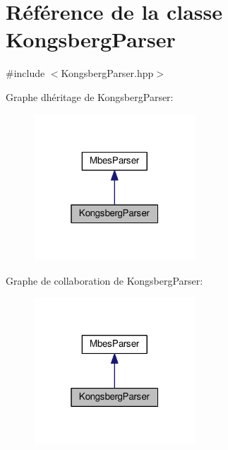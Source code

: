 \hypertarget{classKongsbergParser}{}\section{Référence de la classe Kongsberg\+Parser}
\label{classKongsbergParser}


{\ttfamily \#include $<$Kongsberg\+Parser.\+hpp$>$}



Graphe d\textquotesingle{}héritage de Kongsberg\+Parser\+:
\nopagebreak
\begin{figure}[H]
\begin{center}
\leavevmode
\includegraphics[width=172pt]{classKongsbergParser__inherit__graph}
\end{center}
\end{figure}


Graphe de collaboration de Kongsberg\+Parser\+:
\nopagebreak
\begin{figure}[H]
\begin{center}
\leavevmode
\includegraphics[width=172pt]{classKongsbergParser__coll__graph}
\end{center}
\end{figure}
